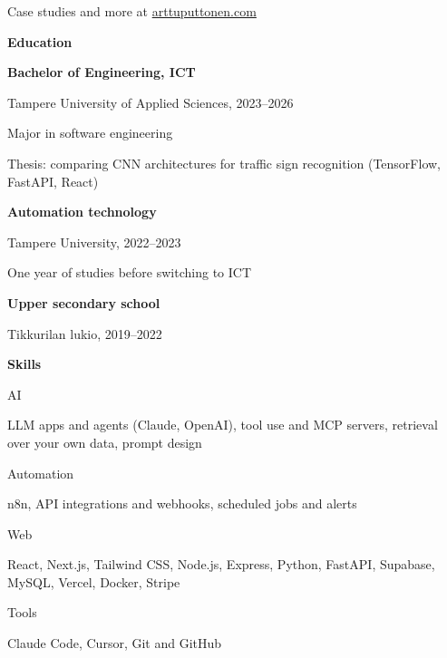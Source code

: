 \documentclass[10pt]{article}
\newcommand{\cvsection}[1]{{\fontsize{12.5}{15}\selectfont\bfseries #1}\par\vspace{3pt}{\color{line}\rule{\linewidth}{0.6pt}}\par\vspace{6pt}}
\newcommand{\sidelabel}[1]{{\color{muted}#1}\par\vspace{2pt}}
\newcommand{\sidegap}{\par\vspace{7pt}}
\begin{document}
\begin{minipage}[t]{0.62\linewidth}
\vspace{14pt}
{\color{muted}Case studies and more at} \href{https://arttuputtonen.com}{arttuputtonen.com}
\end{minipage}\hfill
\begin{minipage}[t]{0.32\linewidth}
\cvsection{Education}
{\bfseries Bachelor of Engineering, ICT}\par
{\color{muted}Tampere University of Applied Sciences, 2023–2026}\par
\vspace{2pt}Major in software engineering\par
\vspace{2pt}Thesis: comparing CNN architectures for traffic sign recognition (TensorFlow, FastAPI, React)\par
\vspace{8pt}
{\bfseries Automation technology}\par
{\color{muted}Tampere University, 2022–2023}\par
\vspace{2pt}One year of studies before switching to ICT\par
\vspace{8pt}
{\bfseries Upper secondary school}\par
{\color{muted}Tikkurilan lukio, 2019–2022}\par
\vspace{8pt}
\vspace{4pt}
\cvsection{Skills}
\sidelabel{AI}
LLM apps and agents (Claude, OpenAI), tool use and MCP servers, retrieval over your own data, prompt design
\sidegap
\sidelabel{Automation}
n8n, API integrations and webhooks, scheduled jobs and alerts
\sidegap
\sidelabel{Web}
React, Next.js, Tailwind CSS, Node.js, Express, Python, FastAPI, Supabase, MySQL, Vercel, Docker, Stripe
\sidegap
\sidelabel{Tools}
Claude Code, Cursor, Git and GitHub
\sidegap
\end{minipage}
\end{document}

